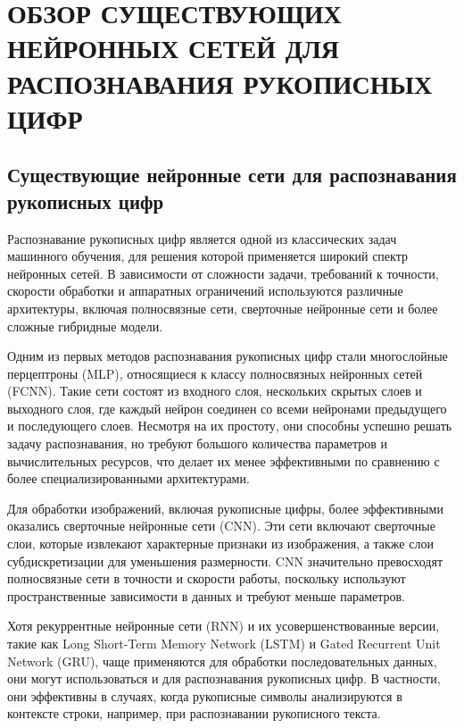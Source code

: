 \chapter[Обзор существующих нейронных сетей для распознавания рукописных цифр]
{ОБЗОР СУЩЕСТВУЮЩИХ НЕЙРОННЫХ СЕТЕЙ ДЛЯ РАСПОЗНАВАНИЯ РУКОПИСНЫХ ЦИФР}

\section{Существующие нейронные сети для распознавания рукописных цифр}\par
\hspace*{12.5 mm}Распознавание рукописных цифр является одной из классических 
задач машинного обучения, для решения которой применяется широкий спектр 
нейронных сетей. В зависимости от сложности задачи, требований к точности, 
скорости обработки и аппаратных ограничений используются различные архитектуры, 
включая полносвязные сети, сверточные нейронные сети и более сложные гибридные 
модели.

Одним из первых методов распознавания рукописных цифр стали многослойные 
перцептроны (MLP), относящиеся к классу полносвязных нейронных сетей (FCNN). 
Такие сети состоят из входного слоя, нескольких скрытых слоев и выходного слоя, 
где каждый нейрон соединен со всеми нейронами предыдущего и последующего слоев. 
Несмотря на их простоту, они способны успешно решать задачу распознавания, но 
требуют большого количества параметров и вычислительных ресурсов, что делает 
их менее эффективными по сравнению с более специализированными архитектурами.

Для обработки изображений, включая рукописные цифры, более эффективными 
оказались сверточные нейронные сети (CNN). Эти сети включают сверточные слои, 
которые извлекают характерные признаки из изображения, а также слои 
субдискретизации для уменьшения размерности. CNN значительно превосходят 
полносвязные сети в точности и скорости работы, поскольку используют 
пространственные зависимости в данных и требуют меньше параметров.

Хотя рекуррентные нейронные сети (RNN) и их усовершенствованные версии, такие 
как Long Short-Term Memory Network (LSTM) и Gated Recurrent Unit Network (GRU),
чаще применяются для обработки последовательных данных, они могут 
использоваться и для распознавания рукописных цифр. В частности, они 
эффективны в случаях, когда рукописные символы анализируются в контексте 
строки, например, при распознавании рукописного текста.

